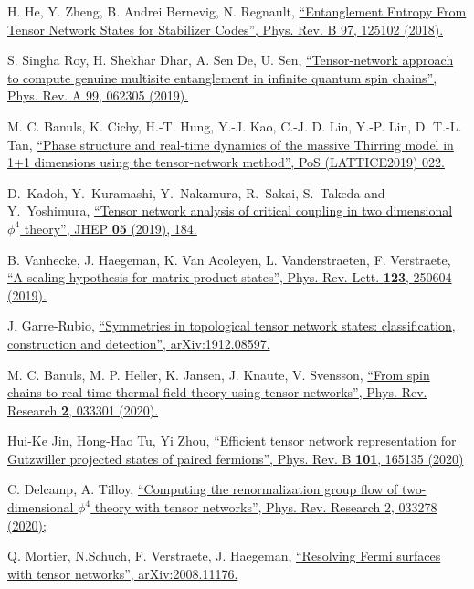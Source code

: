 \documentclass[a4paper,preprintnumbers,nofootinbib,twocolumn]{quantumarticle}
\begin{document}
\begin{thebibliography}{99}
 H.  He, Y. Zheng, B. Andrei Bernevig, N.  Regnault,
\href{https://doi.org/10.1103/PhysRevB.97.125102}{
``Entanglement Entropy From Tensor Network States for Stabilizer Codes'',
Phys. Rev. B 97, 125102 (2018).
}

 S. Singha Roy, H. Shekhar Dhar, A. Sen De, U. Sen,
\href{https://doi.org/10.1103/PhysRevA.99.062305}{
``Tensor-network approach to compute genuine multisite entanglement in infinite quantum spin chains'',
Phys. Rev. A 99, 062305 (2019).
}

 M. C.  Banuls, K.  Cichy, H.-T.  Hung, Y.-J.  Kao, C.-J. D. Lin, Y.-P. Lin, D. T.-L. Tan,
\href{https://doi.org/10.22323/1.363.0022}{
``Phase structure and real-time dynamics of the massive Thirring model in 1+1 dimensions using the tensor-network method'',
 PoS (LATTICE2019) 022.
}

D.~Kadoh, Y.~Kuramashi, Y.~Nakamura, R.~Sakai, S.~Takeda and Y.~Yoshimura,
\href{https://doi.org/10.1007/JHEP05(2019)184}{
``Tensor network analysis of critical coupling in two dimensional $\phi^{4}$ theory'',
JHEP \textbf{05} (2019), 184.
}
 
B. Vanhecke, J.  Haegeman, K. Van Acoleyen, L. Vanderstraeten, F. Verstraete, 
\href{https://doi.org/10.1103/PhysRevLett.123.250604}{
``A scaling hypothesis for matrix product states'', 
 Phys. Rev. Lett. {\bf 123}, 250604 (2019). 
}

 J.  Garre-Rubio, 
\href{https://arxiv.org/abs/1912.08597}{
``Symmetries in topological tensor network states: classification, construction and detection'', arXiv:1912.08597.
}

 M. C. Banuls, M. P. Heller, K. Jansen, J. Knaute, V. Svensson,
\href{https://doi.org/10.1103/PhysRevResearch.2.033301}{
``From spin chains to real-time thermal field theory using tensor networks'',
Phys. Rev. Research {\bf 2}, 033301 (2020).
}

 Hui-Ke Jin, Hong-Hao Tu, Yi Zhou,
\href{https://doi.org/10.1103/PhysRevB.101.165135}{
``Efficient tensor network representation for Gutzwiller projected states of paired fermions'',
Phys. Rev. B {\bf 101}, 165135 (2020)
}

 C. Delcamp, A. Tilloy, 
\href{https://doi.org/10.1103/PhysRevResearch.2.033278}{
``Computing the renormalization group flow of two-dimensional $\phi^4$ theory with tensor networks'',
Phys. Rev. Research 2, 033278 (2020);
}

 Q. Mortier, N.Schuch, F. Verstraete, J. Haegeman,
\href{https://arxiv.org/abs/2008.11176}{
``Resolving Fermi surfaces with tensor networks'', 
arXiv:2008.11176.
}


\end{thebibliography}
\end{document}
